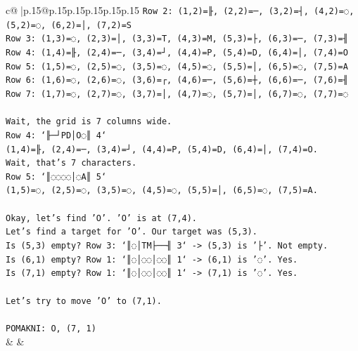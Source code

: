 \documentclass{article}
\begin{document}
{\begin{supertabular}{c@{$\;$}|p{.15\linewidth}@{}p{.15\linewidth}p{.15\linewidth}p{.15\linewidth}p{.15\linewidth}p{.15\linewidth}}
{{{\texttt{Row 2: (1,2)=╟, (2,2)=─, (3,2)=┤, (4,2)=◌, (5,2)=◌, (6,2)=│, (7,2)=S} \\
\texttt{Row 3: (1,3)=◌, (2,3)=│, (3,3)=T, (4,3)=M, (5,3)=├, (6,3)=─, (7,3)=╢} \\
\texttt{Row 4: (1,4)=╟, (2,4)=─, (3,4)=┘, (4,4)=P, (5,4)=D, (6,4)=│, (7,4)=O} \\
\texttt{Row 5: (1,5)=◌, (2,5)=◌, (3,5)=◌, (4,5)=◌, (5,5)=│, (6,5)=◌, (7,5)=A} \\
\texttt{Row 6: (1,6)=◌, (2,6)=◌, (3,6)=┌, (4,6)=─, (5,6)=┼, (6,6)=─, (7,6)=╢} \\
\texttt{Row 7: (1,7)=◌, (2,7)=◌, (3,7)=│, (4,7)=◌, (5,7)=│, (6,7)=◌, (7,7)=◌} \\
\\ 
\texttt{Wait, the grid is 7 columns wide.} \\
\texttt{Row 4: `╟─┘PD│O◌║ 4`} \\
\texttt{(1,4)=╟, (2,4)=─, (3,4)=┘, (4,4)=P, (5,4)=D, (6,4)=│, (7,4)=O.} \\
\texttt{Wait, that's 7 characters.} \\
\texttt{Row 5: `║◌◌◌◌│◌A║ 5`} \\
\texttt{(1,5)=◌, (2,5)=◌, (3,5)=◌, (4,5)=◌, (5,5)=│, (6,5)=◌, (7,5)=A.} \\
\\ 
\texttt{Okay, let's find 'O'. 'O' is at (7,4).} \\
\texttt{Let's find a target for 'O'. Our target was (5,3).} \\
\texttt{Is (5,3) empty? Row 3: `║◌│TM├──╢ 3` {-}> (5,3) is '├'. Not empty.} \\
\texttt{Is (6,1) empty? Row 1: `║◌│◌◌│◌◌║ 1` {-}> (6,1) is '◌'. Yes.} \\
\texttt{Is (7,1) empty? Row 1: `║◌│◌◌│◌◌║ 1` {-}> (7,1) is '◌'. Yes.} \\
\\ 
\texttt{Let's try to move 'O' to (7,1).} \\
\\ 
\texttt{POMAKNI: O, (7, 1)} \\
            }
        }
    }
    & & \\ \\


\end{supertabular}}
\end{document}
